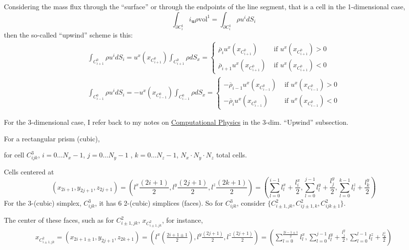 \documentclass[10pt]{amsart}
\begin{document}
\begin{multicols*}{2}
Considering the mass flux through the ``surface'' or through the endpoints of the line segment, that is a cell in the 1-dimensional case,
\[
\int_{\partial C_i^1} i_{\mathbf{u}} \rho \text{vol}^1 = \int_{ \partial C_i^1} \rho u^i dS_i
\]
then the so-called ``upwind'' scheme is this:
\[
\begin{gathered}
  \int_{C^0_{i+1}} \rho u^i dS_i = u^x(x_{C^0_{i+1}}) \int_{C^0_{i+1} } \rho dS_x = \begin{cases} 
    \overline{\rho}_iu^x(x_{C^0_{i+1}} ) & \text{ if } u^x(x_{C^0_{i+1}}) > 0 \\
    \overline{\rho}_{i+1}u^x(x_{C^0_{i+1}} ) & \text{ if } u^x(x_{C^0_{i+1}}) < 0
    \end{cases} \\
  \int_{C^0_{i-1}} \rho u^i dS_i = -u^x(x_{C^0_{i-1}}) \int_{C^0_{i-1} } \rho dS_x = \begin{cases} 
    -\overline{\rho}_{i-1}u^x(x_{C^0_{i-1}} ) & \text{ if } u^x(x_{C^0_{i-1}}) > 0 \\
    -\overline{\rho}_{i}u^x(x_{C^0_{i-1}} ) & \text{ if } u^x(x_{C^0_{i-1}}) < 0
    \end{cases} 
\end{gathered}
\]


For the 3-dimensional case, I refer back to my notes on \href{https://github.com/ernestyalumni/CompPhys/blob/master/LaTeXandpdfs/CompPhys.pdf}{Computational Physics} in the 3-dim. ``Upwind'' subsection. 


For a rectangular prism (cubic),

for cell $C^3_{ijk}$, $i=0 \dots N_x-1$, $j=0 \dots N_y-1$ , $k=0 \dots N_z-1$, $N_x\cdot N_y \cdot N_z$ total cells.

Cells centered at
\[
(x_{2i+1}, y_{2j+1}, z_{2j+1}) = (l^x \frac{ (2i+1)}{2} , l^y \frac{(2j+1)}{2}, l^z \frac{(2k+1)}{2} ) = \left( \sum_{l=0}^{i-1} l_l^x + \frac{l_i^x}{2} , \sum_{l=0}^{j-1}l_l^y + \frac{l_j^y}{2}, \sum_{l=0}^{k-1}l_l^z + \frac{l_k^y}{2}  \right)
\]
For the 3-(cubic) simplex, $C^3_{ijk}$, it has 6 2-(cubic) simplices (faces).  So for $C_{ijk}^3$, consider $\lbrace C^2_{i\pm 1, jk}, C^2_{ij\pm 1,k}, C^2_{ijk\pm 1}\rbrace$.

The center of these faces, such as for $C^2_{i\pm 1, jk}$, $x_{ C^2_{i\pm 1, jk} }$, for instance,
\[
\begin{aligned}
 x_{C^2_{i\pm 1,jk}} = (x_{2i+1\pm 1},y_{2j+1},z_{2k+1}) = (l^x\left( \frac{2i+1\pm 1}{2}\right) , l^y\frac{(2j+1)}{2},  l^z\frac{(2j+1)}{2} ) = \left( \sum_{l=0}^{ \frac{2i - 1 \pm 1 }{2} } l_l^x, \sum_{l=0}^{j-1} l_l^y + \frac{l_j^y}{2}, \sum_{l=0}^{l-1} l_l^z + \frac{l_k^z}{2} \right) 
  \end{aligned}
\]


\end{multicols*}
\end{document}
